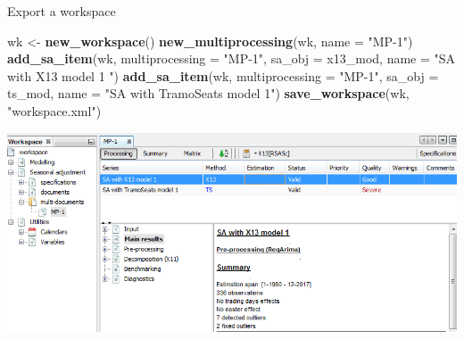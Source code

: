 \documentclass[10pt,xcolor=table,color={dvipsnames,usenames},ignorenonframetext,usepdftitle=false,french]{beamer}
\newenvironment{Shaded}{\begin{snugshade}}{\end{snugshade}}
\newcommand{\DataTypeTok}[1]{\textcolor[rgb]{0.13,0.29,0.53}{#1}}
\newcommand{\KeywordTok}[1]{\textcolor[rgb]{0.13,0.29,0.53}{\textbf{#1}}}
\newcommand{\NormalTok}[1]{#1}
\newcommand{\StringTok}[1]{\textcolor[rgb]{0.31,0.60,0.02}{#1}}
\begin{document}
\begin{frame}[fragile]{Export a workspace}
\protect\hypertarget{export-a-workspace}{}

\footnotesize

\begin{Shaded}
\begin{Highlighting}[]
\NormalTok{wk <-}\StringTok{ }\KeywordTok{new_workspace}\NormalTok{()}
\KeywordTok{new_multiprocessing}\NormalTok{(wk, }\DataTypeTok{name =} \StringTok{"MP-1"}\NormalTok{)}
\KeywordTok{add_sa_item}\NormalTok{(wk, }\DataTypeTok{multiprocessing =} \StringTok{"MP-1"}\NormalTok{,}
            \DataTypeTok{sa_obj =}\NormalTok{ x13_mod, }\DataTypeTok{name =}  \StringTok{"SA with X13 model 1 "}\NormalTok{)}
\KeywordTok{add_sa_item}\NormalTok{(wk, }\DataTypeTok{multiprocessing =}  \StringTok{"MP-1"}\NormalTok{,}
            \DataTypeTok{sa_obj =}\NormalTok{ ts_mod, }\DataTypeTok{name =} \StringTok{"SA with TramoSeats model 1"}\NormalTok{)}
\KeywordTok{save_workspace}\NormalTok{(wk, }\StringTok{"workspace.xml"}\NormalTok{)}
\end{Highlighting}
\end{Shaded}

\includegraphics{img/workspace.png}

\end{frame}
\end{document}
